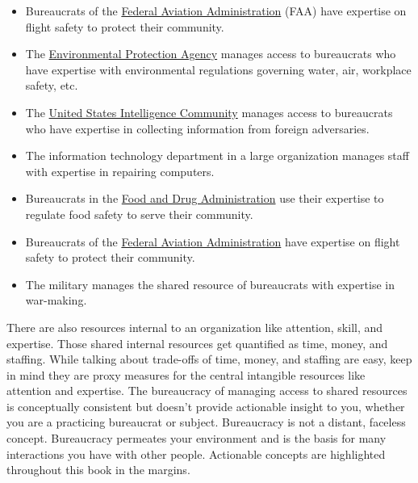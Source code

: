 \begin{itemize}
      \item Bureaucrats of the \href{https://www.faa.gov/}{Federal Aviation Administration} (FAA) have expertise on flight safety to protect their community.
      \item The \href{https://www.epa.gov/}{Environmental Protection Agency} manages access to bureaucrats who have expertise with environmental regulations governing water, air, workplace safety, etc.
      \item The \href{https://www.intelligence.gov/}{United States Intelligence Community} manages access to bureaucrats who have expertise in collecting information from foreign adversaries.
      \item The information technology department in a large organization manages staff with expertise in repairing computers.%
      \item Bureaucrats in the \href{https://www.fda.gov/}{Food and Drug Administration} use their expertise to regulate food safety to serve their community.%
      \item Bureaucrats of the \href{https://www.faa.gov/}{Federal Aviation Administration} have expertise on flight safety to protect their community.%
      \item The military manages the shared resource of bureaucrats with expertise in war-making.
  \end{itemize}

There are also resources internal to an organization like attention, skill, and expertise. Those shared internal resources get quantified as time, money, and staffing. While talking about trade-offs of time, money, and staffing are easy, keep in mind they are proxy measures for the central intangible resources like attention and expertise.
The bureaucracy of managing access to shared resources is conceptually consistent but doesn't provide actionable insight to you, whether you are a practicing bureaucrat or subject. 
Bureaucracy is not a distant, faceless concept. Bureaucracy permeates your environment and is the basis for many interactions you have with other people. 
Actionable concepts are highlighted throughout this book in the margins.


